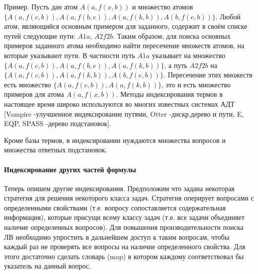 Пример. Пусть дан атом $A(a,f(x,b))$ и множество атомов $\{A(a,f(c,b)), A(a,f(b,e)),A(a,f(k,b)), A(b,f(e,b))\}$. Любой атом, являющийся основным примером для заданного, содержит в своём списке путей следующие пути: $A1a$, $A2f2b$. Таким образом, для поиска основных примеров заданного атома необходимо найти пересечение множеств атомов, на которые указывают пути.  В частности путь $A1a$ указывает на множество $\{A(a,f(c,b)), A(a,f(b,e)),A(a,f(k,b))\}$, а путь $A2f2b$ на $\{A(a,f(c,b)), A(a,f(k,b)), A(b,f(e,b))\}$. Пересечение этих множеств есть множество $\{A(a,f(c,b)),A(a,f(k,b))\}$, это и есть множество примеров для атома $A(a,f(x,b))$. Методы индексирования термов в настоящее время широко используются во многих известных системах АДТ [Vampire -улучшенное индексирование путями, Otter -дискр.дерево и пути, E, EQP, SPASS -дерево подстановок].

Кроме базы термов, в индексировании нуждаются множества вопросов и множества ответных подстановок.

\paragraph{Индексирование других частей формулы}
Теперь опишем другие  индексирования. Предположим что  задана некоторая стратегия для решения некоторого класса задач. Стратегия оперирует вопросами с определенными свойствами (т.е. вопросу сопоставляется содержательная информация), которые присущи всему классу задач (т.е. все задачи объединяет наличие определенных вопросов). Для повышения производительности поиска ЛВ необходимо упростить в дальнейшем доступ к таким вопросам, чтобы каждый раз не проверять все вопросы на наличие определенного свойства. Для этого достаточно сделать словарь (map) в котором каждому  соответствовал бы указатель на данный вопрос. 

